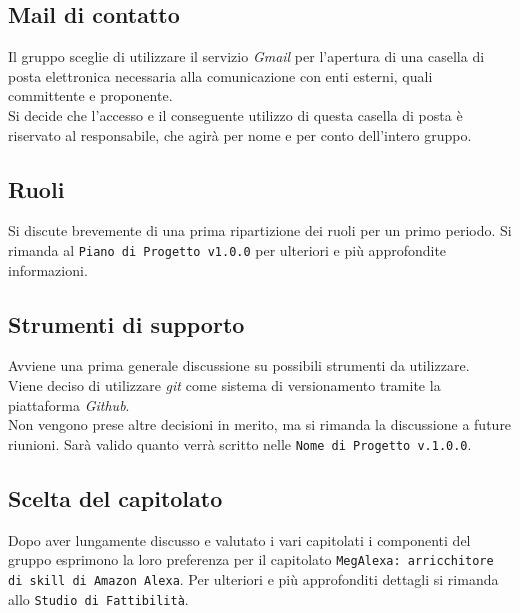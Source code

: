 \documentclass[a4paper,12pt]{article}
\begin{document}
	\subsection{Mail di contatto}
	Il gruppo sceglie di utilizzare il servizio \textit{Gmail} per l'apertura di una casella di posta elettronica necessaria alla comunicazione con enti esterni, quali committente e proponente.\\
	Si decide che l'accesso e il conseguente utilizzo di questa casella di posta è riservato al responsabile, che agirà per nome e per conto dell'intero gruppo. 
	\subsection{Ruoli}
	Si discute brevemente di una prima ripartizione dei ruoli per un primo periodo. Si rimanda al \texttt{Piano di Progetto v1.0.0} per ulteriori e più approfondite informazioni.
	\subsection{Strumenti di supporto}
	Avviene una prima generale discussione su possibili strumenti da utilizzare. \\
	Viene deciso di utilizzare \textit{git} come sistema di versionamento tramite la piattaforma \textit{Github}. \\
	Non vengono prese altre decisioni in merito, ma si rimanda la discussione a future riunioni. 
	Sarà valido quanto verrà scritto nelle \texttt{Nome di Progetto v.1.0.0}.
	\subsection{Scelta del capitolato}
	Dopo aver lungamente discusso e valutato i vari capitolati i componenti del gruppo esprimono la loro preferenza per il capitolato \texttt{MegAlexa: arricchitore di skill di Amazon Alexa}. Per ulteriori e più approfonditi dettagli si rimanda allo \texttt{Studio di Fattibilità}.
	\label{LastPage}
\end{document}
